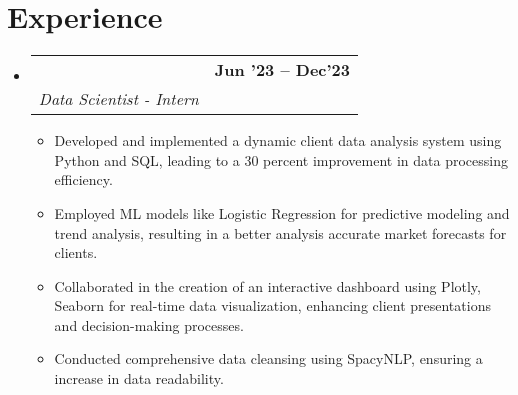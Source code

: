 \documentclass[letterpaper,11pt]{article}
\makeatletter
\newcommand{\resumeItem}[1]{
  \item\small{
    {#1 \vspace{-2pt}}
  }
}
\newcommand{\resumeSubheading}[4]{
  \vspace{-2pt}\item
    \begin{tabular*}{1.0\textwidth}[t]{l@{\extracolsep{\fill}}r}
      \textbf{#1} & \textbf{\small #2} \\
      \textit{\small#3} & \textit{\small #4} \\
    \end{tabular*}\vspace{-7pt}
}
\newcommand{\resumeSubHeadingListStart}{\begin{itemize}[leftmargin=0.0in, label={}]}
\newcommand{\resumeSubHeadingListEnd}{\end{itemize}}
\newcommand{\resumeItemListStart}{\justify \begin{itemize}}
\newcommand{\resumeItemListEnd}{\end{itemize}\vspace{-2pt}}
\makeatother
\begin{document}
\section{Experience}
  \resumeSubHeadingListStart
    \resumeSubheading
      {{Surya Consultants}\href{https://suryaconsultants.com/}}{Jun '23 -- Dec'23}
      {Data Scientist - Intern}{}
      \vspace{-7pt}
      \resumeItemListStart
          \resumeItem{Developed and implemented a dynamic client data analysis system using Python and SQL, leading to a 30 percent improvement in data processing efficiency.}
          \resumeItem{Employed ML models like Logistic Regression for predictive modeling and trend analysis, resulting in a better analysis accurate market forecasts for clients.}
          \resumeItem{Collaborated in the creation of an interactive dashboard using Plotly, Seaborn for real-time data visualization, enhancing client presentations and decision-making processes.}
          \resumeItem{Conducted comprehensive data cleansing using SpacyNLP, ensuring a increase in data readability.}

     \resumeItemListEnd

    
  \resumeSubHeadingListEnd

\end{document}
